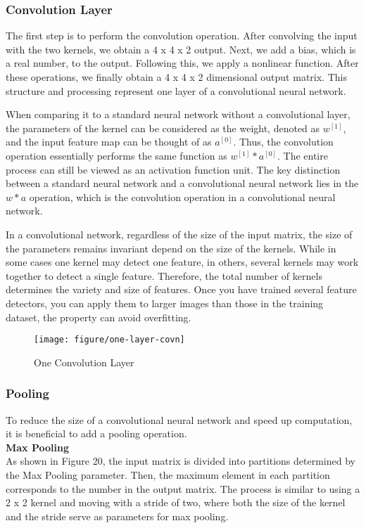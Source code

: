 \documentclass{article}
\begin{document}
\newpage
\subsubsection{Convolution Layer}
The first step is to perform the convolution operation. After convolving the input with the two kernels, we obtain a 4 x 4 x 2 output. Next, we add a bias, which is a real number, to the output. Following this, we apply a nonlinear function. After these operations, we finally obtain a 4 x 4 x 2 dimensional output matrix. This structure and processing represent one layer of a convolutional neural network.

When comparing it to a standard neural network without a convolutional layer, the parameters of the kernel can be considered as the weight, denoted as $w^{[1]}$, and the input feature map can be thought of as $a^{[0]}$. Thus, the convolution operation essentially performs the same function as $w^{[1]} * a^{[0]}$. The entire process can still be viewed as an activation function unit. The key distinction between a standard neural network and a convolutional neural network lies in the $w * a$ operation, which is the convolution operation in a convolutional neural network.

In a convolutional network, regardless of the size of the input matrix, the size of the parameters remains invariant depend on the size of the kernels. While in some cases one kernel may detect one feature, in others, several kernels may work together to detect a single feature. Therefore, the total number of kernels determines the variety and size of features. Once you have trained several feature detectors, you can apply them to larger images than those in the training dataset, the property can avoid overfitting.

\begin{figure}[htbp]
        \centering
        \texttt{[image: figure/one-layer-covn]}
        \caption{One Convolution Layer}
     \end{figure}


\newpage
\subsubsection{Pooling}


To reduce the size of a convolutional neural network and speed up computation, it is beneficial to add a pooling operation.\\

\noindent
\textbf{Max Pooling}\\
\noindent
As shown in Figure 20, the input matrix is divided into partitions determined by the Max Pooling parameter. Then, the maximum element in each partition corresponds to the number in the output matrix. The process is similar to using a 2 x 2 kernel and moving with a stride of two, where both the size of the kernel and the stride serve as parameters for max pooling.
\end{document}
